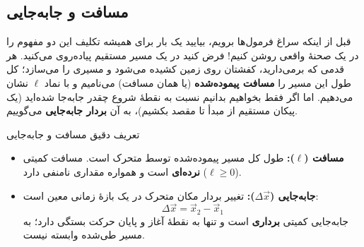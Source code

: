 \documentclass[12pt, a4paper]{article}
\begin{document}
\subsection{مسافت و جابه‌جایی}

قبل از اینکه سراغ فرمول‌ها برویم، بیایید یک بار برای همیشه تکلیف این دو مفهوم را در یک صحنهٔ واقعی روشن کنیم! فرض کنید در یک مسیر مستقیم پیاده‌روی می‌کنید. هر قدمی که برمی‌دارید، کفشتان روی زمین کشیده می‌شود و مسیری را می‌سازد؛ کل طول این مسیر را \textbf{مسافت پیموده‌شده} (یا همان مسافت) می‌نامیم و با نماد $\ell$ نشان می‌دهیم. اما اگر فقط بخواهیم بدانیم نسبت به نقطهٔ شروع چقدر جابه‌جا شده‌اید (یک پیکان مستقیم از مبدأ تا مقصد بکشیم)، به آن \textbf{بردار جابه‌جایی} می‌گوییم.

\begin{conceptbox}{تعریف دقیق مسافت و جابه‌جایی}
\begin{itemize}
    \item \textbf{مسافت ($\ell$):} طول کل مسیر پیموده‌شده توسط متحرک است. مسافت کمیتی \textbf{نرده‌ای} است و همواره مقداری نامنفی دارد ($\ell \ge 0$).
    \item \textbf{جابه‌جایی ($\Delta\vec{x}$):} تغییر بردار مکان متحرک در یک بازهٔ زمانی معین است:
    \[
    \Delta\vec{x} = \vec{x}_2 - \vec{x}_1
    \]
    جابه‌جایی کمیتی \textbf{برداری} است و تنها به نقطهٔ آغاز و پایان حرکت بستگی دارد؛ به مسیر طی‌شده وابسته نیست.
\end{itemize}
\end{conceptbox}

\begin{center}
\end{center}
\end{document}
